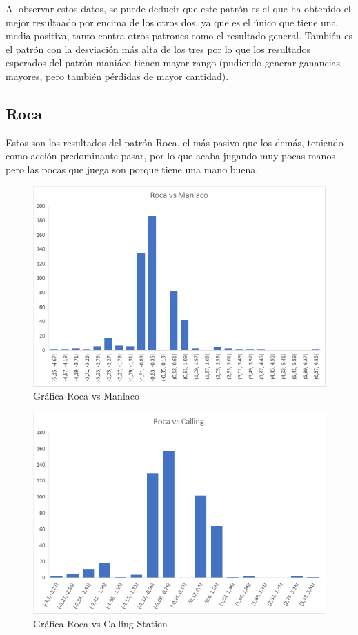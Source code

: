 Al observar estos datos, se puede deducir que este patrón es el que ha obtenido el mejor resultaado por encima de los otros dos, ya que es el único que tiene una media positiva, tanto contra otros patrones como el resultado general. También es el patrón con la desviación más alta de los tres por lo que los resultados esperados del patrón maniáco tienen mayor rango (pudiendo generar ganancias mayores, pero también pérdidas de mayor cantidad).

\newpage

\subsection{Roca}

Estos son los resultados del patrón Roca, el más pasivo que los demás, teniendo como acción predominante pasar, por lo que acaba jugando muy pocas manos pero las pocas que juega son porque tiene una mano buena.

\begin{figure}[h]
\centering
\includegraphics[width=.65\textwidth]{figuras/RvM.png}   
\caption{Gráfica Roca vs Maniaco}
\label{fig:RvM}
\end{figure}

\begin{figure}[h]
\centering
\includegraphics[width=.65\textwidth]{figuras/RvC.png}   
\caption{Gráfica Roca vs Calling Station}
\label{fig:RvC}
\end{figure}

